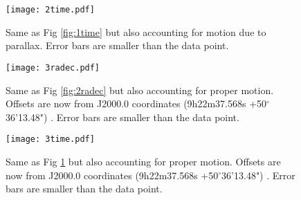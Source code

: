 \documentclass[preprint]{aastex}
\begin{document}
\begin{figure}
\begin{center}
    \texttt{[image: 2time.pdf]}
    \caption{Same as Fig \ref{fig:1time} but also accounting for motion due to parallax. Error bars are smaller than the data point.}
    \label{fig:2time}
\end{center}
\end{figure}

\begin{figure}
\begin{center}
    \texttt{[image: 3radec.pdf]}
    \caption{Same as Fig \ref{fig:2radec} but also accounting for proper motion. Offsets are now from J2000.0 coordinates (9h22m37.568s +50$^\circ$36'13.48") . Error bars are smaller than the data point.}
    \label{fig:3radec}
\end{center}
\end{figure}

\begin{figure}
\begin{center}
    \texttt{[image: 3time.pdf]}
    \caption{Same as Fig \ref{fig:2time} but also accounting for proper motion. Offsets are now from J2000.0 coordinates (9h22m37.568s +50$^\circ$36'13.48") . Error bars are smaller than the data point.}
    \label{fig:3time}
\end{center}
\end{figure}

\cleardoublepage



\end{document}
